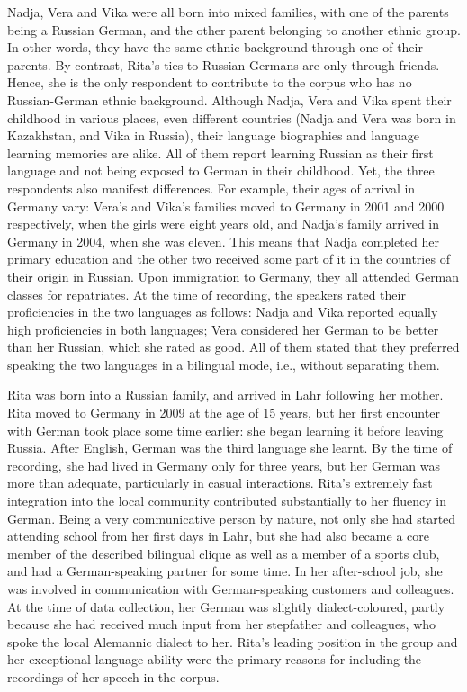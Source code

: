 Nadja, Vera and Vika were all born into mixed families, with one of the parents being a Russian German, and the other parent belonging to another ethnic group. In other words, they have the same ethnic background through one of their parents. By contrast, Rita's ties to Russian Germans are only through friends. Hence, she is the only respondent to contribute to the corpus who has no Russian-German ethnic background. Although Nadja, Vera and Vika spent their childhood in various places, even different countries (Nadja and Vera was born in Kazakhstan, and Vika in Russia), their language biographies and language learning memories are alike. All of them report learning Russian as their first language and not being exposed to German in their childhood. Yet, the three respondents also manifest differences. For example, their ages of arrival in Germany vary: Vera's and Vika's families moved to Germany in 2001 and 2000 respectively, when the girls were eight years old, and Nadja's family arrived in Germany in 2004, when she was eleven. This means that Nadja completed her primary education and the other two received some part of it in the countries of their origin in Russian. Upon immigration to Germany, they all attended German classes for repatriates. At the time of recording, the speakers rated their proficiencies in the two languages as follows: Nadja and Vika reported equally high proficiencies in both languages; Vera considered her German to be better than her Russian, which she rated as good. All of them stated that they preferred speaking the two languages in a bilingual mode, i.e., without separating them.

Rita was born into a Russian family, and arrived in Lahr following her mother. Rita moved to Germany in 2009 at the age of 15 years, but her first encounter with German took place some time earlier: she began learning it before leaving Russia. After English, German was the third language she learnt. By the time of recording, she had lived in Germany only for three years, but her German was more than adequate, particularly in casual interactions. Rita's extremely fast integration into the local community contributed substantially to her fluency in German. Being a very communicative person by nature, not only she had started attending school from her first days in Lahr, but she had also became a core member of the described bilingual clique as well as a member of a sports club, and had a German-speaking partner for some time. In her after-school job, she was involved in communication with German-speaking customers and colleagues. At the time of data collection, her German was slightly dialect-coloured, partly because she had received much input from her stepfather and colleagues, who spoke the local Alemannic dialect to her. Rita's leading position in the group and her exceptional language ability were the primary reasons for including the recordings of her speech in the corpus.\\

